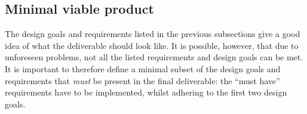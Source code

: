 \subsection{Minimal viable product}
\label{ssec:mvp}

The design goals and requirements listed in the previous subsections give a good
idea of what the deliverable should look like. It is possible, however, that due
to unforeseen problems, not all the listed requirements and design goals can be
met. It is important to therefore define a minimal subset of the design goals
and requirements that \emph{must} be present in the final deliverable: the
``must have'' requirements have to be implemented, whilst adhering to the first
two design goals.

